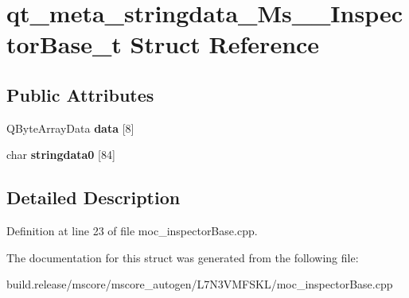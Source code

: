 \hypertarget{structqt__meta__stringdata___ms_____inspector_base__t}{}\section{qt\+\_\+meta\+\_\+stringdata\+\_\+\+Ms\+\_\+\+\_\+\+Inspector\+Base\+\_\+t Struct Reference}
\label{structqt__meta__stringdata___ms_____inspector_base__t}
\subsection*{Public Attributes}
\begin{DoxyCompactItemize}
\item 
\mbox{\label{structqt__meta__stringdata___ms_____inspector_base__t_ac8504fb0a4b1049fab7956a0bc3a38fe}} 
Q\+Byte\+Array\+Data {\bfseries data} \mbox{[}8\mbox{]}
\item 
\mbox{\label{structqt__meta__stringdata___ms_____inspector_base__t_a92f6f1f5e73fb9991f87c4ef0dfe9341}} 
char {\bfseries stringdata0} \mbox{[}84\mbox{]}
\end{DoxyCompactItemize}


\subsection{Detailed Description}


Definition at line 23 of file moc\+\_\+inspector\+Base.\+cpp.



The documentation for this struct was generated from the following file\+:\begin{DoxyCompactItemize}
\item 
build.\+release/mscore/mscore\+\_\+autogen/\+L7\+N3\+V\+M\+F\+S\+K\+L/moc\+\_\+inspector\+Base.\+cpp\end{DoxyCompactItemize}
